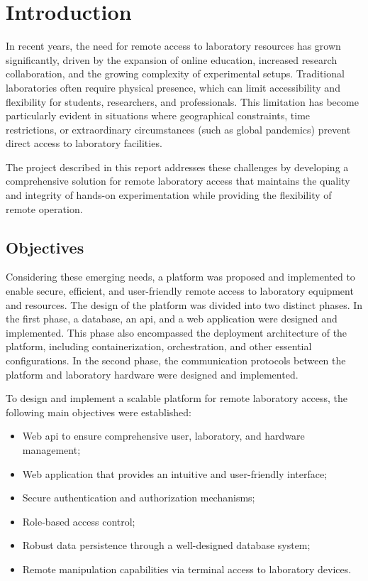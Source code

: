 %
%
\chapter{Introduction}\label{cap:intro}
In recent years, the need for remote access to laboratory resources has grown significantly, driven by the expansion of online education, increased research collaboration, and the growing complexity of experimental setups. Traditional laboratories often require physical presence, which can limit accessibility and flexibility for students, researchers, and professionals. This limitation has become particularly evident in situations where geographical constraints, time restrictions, or extraordinary circumstances (such as global pandemics) prevent direct access to laboratory facilities.

The project described in this report addresses these challenges by developing a comprehensive solution for remote laboratory access that maintains the quality and integrity of hands-on experimentation while providing the flexibility of remote operation.

%
%
\section{Objectives}\label{sec:objectives}
Considering these emerging needs, a platform was proposed and implemented to enable secure, efficient, and user-friendly remote access to laboratory equipment and resources. The design of the platform was divided into two distinct phases. In the first phase, a database, an \acf{api}, and a web application were designed and implemented. This phase also encompassed the deployment architecture of the platform, including containerization, orchestration, and other essential configurations. In the second phase, the communication protocols between the platform and laboratory hardware were designed and implemented.

To design and implement a scalable platform for remote laboratory access, the following main objectives were established:
\begin{itemize}
\item Web \acs{api} to ensure comprehensive user, laboratory, and hardware management;
\item Web application that provides an intuitive and user-friendly interface;
\item Secure authentication and authorization mechanisms;
\item Role-based access control;
\item Robust data persistence through a well-designed database system;
\item Remote manipulation capabilities via terminal access to laboratory devices.
\end{itemize}

